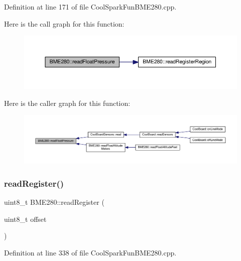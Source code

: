 Definition at line 171 of file Cool\+Spark\+Fun\+B\+M\+E280.\+cpp.

Here is the call graph for this function\+:
\nopagebreak
\begin{figure}[H]
\begin{center}
\leavevmode
\includegraphics[width=350pt]{class_b_m_e280_ada6e799917afb4f228e6253bc56ffe75_cgraph}
\end{center}
\end{figure}
Here is the caller graph for this function\+:
\nopagebreak
\begin{figure}[H]
\begin{center}
\leavevmode
\includegraphics[width=350pt]{class_b_m_e280_ada6e799917afb4f228e6253bc56ffe75_icgraph}
\end{center}
\end{figure}
\mbox{\label{class_b_m_e280_a1bbd14c8591966df531e40085342ff71}} 
\subsubsection{\texorpdfstring{read\+Register()}{readRegister()}}
{\footnotesize\ttfamily uint8\+\_\+t B\+M\+E280\+::read\+Register (\begin{DoxyParamCaption}\item[{uint8\+\_\+t}]{offset }\end{DoxyParamCaption})}



Definition at line 338 of file Cool\+Spark\+Fun\+B\+M\+E280.\+cpp.

